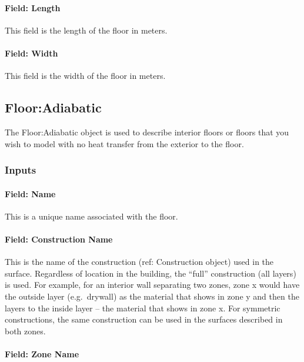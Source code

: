 \paragraph{Field: Length}\label{field-length-7}

This field is the length of the floor in meters.

\paragraph{Field: Width}\label{field-width-3}

This field is the width of the floor in meters.

\subsection{Floor:Adiabatic}\label{flooradiabatic}

The Floor:Adiabatic object is used to describe interior floors or floors that you wish to model with no heat transfer from the exterior to the floor.

\subsubsection{Inputs}\label{inputs-12-019}

\paragraph{Field: Name}\label{field-name-8-022}

This is a unique name associated with the floor.

\paragraph{Field: Construction Name}\label{field-construction-name-8}

This is the name of the construction (ref: Construction object) used in the surface. Regardless of location in the building, the ``full'' construction (all layers) is used. For example, for an interior wall separating two zones, zone x would have the outside layer (e.g.~drywall) as the material that shows in zone y and then the layers to the inside layer -- the material that shows in zone x. For symmetric constructions, the same construction can be used in the surfaces described in both zones.

\paragraph{Field: Zone Name}\label{field-zone-name-8-003}

